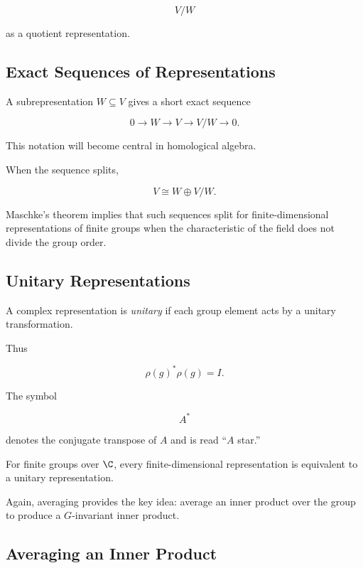 \[ V/W \]

as a quotient representation.

\subsection{Exact Sequences of Representations}
\label{subsec:exact-sequences-representations}

A subrepresentation \(W\subseteq V\) gives a short exact sequence

\[ 0\longrightarrow W\longrightarrow V\longrightarrow V/W\longrightarrow0. \]

This notation will become central in homological algebra.

When the sequence splits,

\[ V\cong W\oplus V/W. \]

Maschke's theorem implies that such sequences split for finite-dimensional
representations of finite groups when the characteristic of the field does
not divide the group order.

\subsection{Unitary Representations}
\label{subsec:unitary-representations}

A complex representation is \emph{unitary} if each group element acts by a
unitary transformation.

Thus

\[ \rho(g)^*\rho(g)=I. \]

The symbol

\[ A^* \]

denotes the conjugate transpose of \(A\) and is read ``\(A\) star.''

For finite groups over \(\C\), every finite-dimensional representation is
equivalent to a unitary representation.

Again, averaging provides the key idea: average an inner product over the
group to produce a \(G\)-invariant inner product.

\subsection{Averaging an Inner Product}
\label{subsec:averaging-inner-product}

